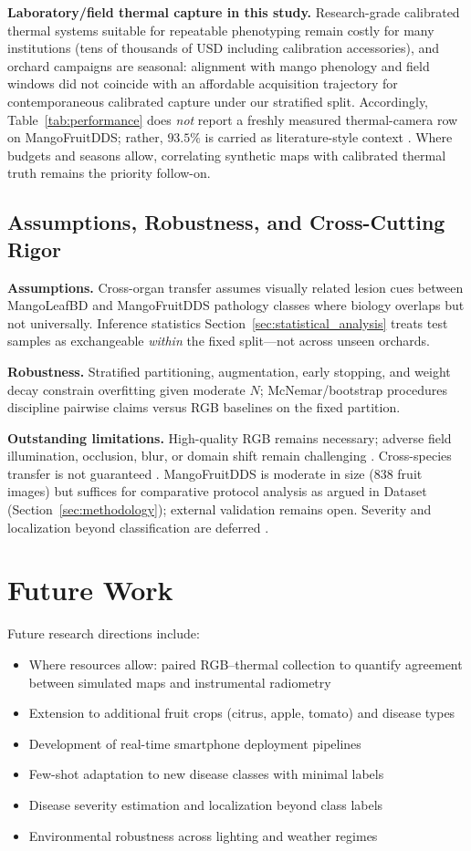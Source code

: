 \documentclass[utf8]{FrontiersinHarvard} %
\begin{document}
\textbf{Laboratory/field thermal capture in this study.} Research-grade calibrated thermal systems suitable for repeatable phenotyping remain costly for many institutions (tens of thousands of USD including calibration accessories), and orchard campaigns are seasonal: alignment with mango phenology and field windows did not coincide with an affordable acquisition trajectory for contemporaneous calibrated capture under our stratified split. Accordingly, Table~\ref{tab:performance} does \textit{not} report a freshly measured thermal-camera row on MangoFruitDDS; rather, $93.5\%$ is carried as literature-style context \cite{khanal2017,pineda2021}. Where budgets and seasons allow, correlating synthetic maps with calibrated thermal truth remains the priority follow-on.

\subsection{Assumptions, Robustness, and Cross-Cutting Rigor}
\textbf{Assumptions.} Cross-organ transfer assumes visually related lesion cues between MangoLeafBD and MangoFruitDDS pathology classes where biology overlaps but not universally. Inference statistics Section~\ref{sec:statistical_analysis} treats test samples as exchangeable \emph{within} the fixed split---not across unseen orchards.

\textbf{Robustness.} Stratified partitioning, augmentation, early stopping, and weight decay constrain overfitting given moderate \(N\); McNemar/bootstrap procedures discipline pairwise claims versus RGB baselines on the fixed partition.

\textbf{Outstanding limitations.} High-quality RGB remains necessary; adverse field illumination, occlusion, blur, or domain shift remain challenging \cite{kouidri2021}. Cross-species transfer is not guaranteed \cite{weiss2016}. MangoFruitDDS is moderate in size (\(838\) fruit images) but suffices for comparative protocol analysis as argued in Dataset (Section~\ref{sec:methodology}); external validation remains open. Severity and localization beyond classification are deferred \cite{wang2022_synthetic}.

\section{Future Work}
Future research directions include:
\begin{itemize}
    \item Where resources allow: paired RGB--thermal collection to quantify agreement between simulated maps and instrumental radiometry \cite{zhai2020}
    \item Extension to additional fruit crops (citrus, apple, tomato) and disease types
    \item Development of real-time smartphone deployment pipelines
    \item Few-shot adaptation to new disease classes with minimal labels
    \item Disease severity estimation and localization beyond class labels
    \item Environmental robustness across lighting and weather regimes
\end{itemize}
\end{document}
